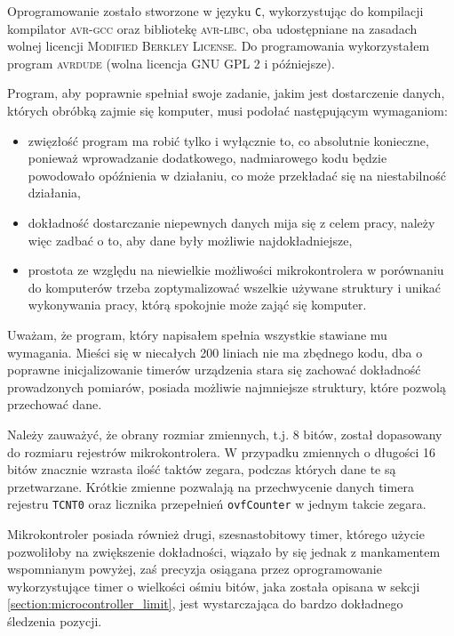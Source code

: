 Oprogramowanie zostało stworzone w języku \texttt{C}, wykorzystując do kompilacji kompilator \textsc{avr-gcc} oraz bibliotekę \textsc{avr-libc}, oba udostępniane na zasadach wolnej licencji \textsc{Modified Berkley License}. Do programowania wykorzystałem program \textsc{avrdude} (wolna licencja \textsc{GNU GPL 2} i późniejsze).

Program, aby poprawnie spełniał swoje zadanie, jakim jest dostarczenie danych, których obróbką zajmie się komputer, musi podołać następującym wymaganiom:
\begin{itemize}
 \item zwięzłość \ppauza program ma robić tylko i wyłącznie to, co absolutnie konieczne, ponieważ wprowadzanie dodatkowego, nadmiarowego kodu będzie powodowało opóźnienia w działaniu, co może przekładać się na
    niestabilność działania,
 \item dokładność \ppauza dostarczanie niepewnych danych mija się z celem pracy, należy więc zadbać o to, aby dane były możliwie najdokładniejsze,
 \item prostota \ppauza ze względu na niewielkie możliwości mikrokontrolera \ppauza w porównaniu do komputerów \ppauza trzeba zoptymalizować wszelkie używane struktury i unikać wykonywania pracy, którą spokojnie może zająć się komputer.
\end{itemize}

Uważam, że program, który napisałem spełnia wszystkie stawiane mu wymagania. Mieści się w niecałych 200 liniach \ppauza nie ma zbędnego kodu, dba o poprawne inicjalizowanie timerów urządzenia \ppauza stara się zachować dokładność prowadzonych pomiarów, posiada możliwie najmniejsze struktury, które pozwolą przechować dane.

Należy zauważyć, że obrany rozmiar zmiennych, t.j. 8 bitów, został dopasowany do rozmiaru rejestrów mikrokontrolera. W przypadku zmiennych o długości 16 bitów znacznie wzrasta ilość taktów zegara, podczas których dane te są przetwarzane. Krótkie zmienne pozwalają na przechwycenie danych timera \ppauza rejestru \texttt{TCNT0} oraz licznika przepełnień \texttt{ovfCounter} \ppauza w jednym takcie zegara.

Mikrokontroler posiada również drugi, szesnastobitowy timer, którego użycie pozwoliłoby na zwiększenie dokładności, wiązało by się jednak z mankamentem wspomnianym powyżej, zaś precyzja osiągana przez oprogramowanie wykorzystujące timer o wielkości ośmiu bitów, jaka została opisana w sekcji \ref{section:microcontroller_limit}, jest wystarczająca do bardzo dokładnego śledzenia pozycji.


